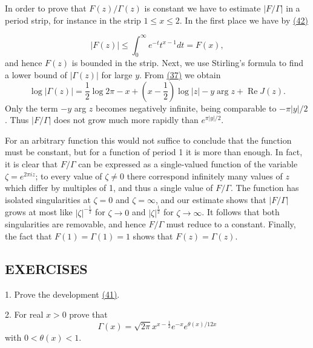 In order to prove that $F(z) / \Gamma(z)$ is constant we have to estimate $|F / \Gamma|$ in a period strip, for instance in the strip $1 \leq x \leq 2$. In the first place we have by \hyperref[eq:5.42]{(42)}


\begin{equation*}
| F (z) | \leq \int_ {0} ^ {\infty} e ^ {- t} t ^ {x - 1} d t = F (x),
\end{equation*}
and hence $F(z)$ is bounded in the strip. Next, we use Stirling's formula to find a lower bound of $|\Gamma(z)|$ for large $y$. From \hyperref[eq:5.37]{(37)} we obtain
\begin{equation*}
\log | \Gamma (z) | = \frac {1}{2} \log 2 \pi - x + (x - \frac {1}{2}) \log | z | - y \arg z + \operatorname{Re} J (z).
\end{equation*}
Only the term $-y$ arg $z$ becomes negatively infinite, being comparable to $-\pi |y| / 2$. Thus $|F / \Gamma|$ does not grow much more rapidly than $e^{\pi |y| / 2}$.

For an arbitrary function this would not suffice to conclude that the function must be constant, but for a function of period 1 it is more than enough. In fact, it is clear that $F / \Gamma$ can be expressed as a single-valued function of the variable $\zeta = e^{2\pi iz}$; to every value of $\zeta \neq 0$ there correspond infinitely many values of $z$ which differ by multiples of 1, and thus a single value of $F / \Gamma$. The function has isolated singularities at $\zeta = 0$ and $\zeta = \infty$, and our estimate shows that $|F / \Gamma|$ grows at most like $|\zeta|^{-\frac{1}{2}}$ for $\zeta \to 0$ and $|\zeta|^{\frac{1}{2}}$ for $\zeta \to \infty$. It follows that both singularities are removable, and hence $F / \Gamma$ must reduce to a constant. Finally, the fact that $F(1) = \Gamma(1) = 1$ shows that $F(z) = \Gamma(z)$.

\subsection*{EXERCISES}
1. Prove the development \hyperref[eq:5.41]{(41)}.

2. For real $x > 0$ prove that
\begin{equation*}
\Gamma (x) = \sqrt {2 \pi} x ^ {x - \frac {1}{2}} e ^ {- x} e ^ {\theta (x) / 12 x}
\end{equation*}
with $0 < \theta(x) < 1$.

